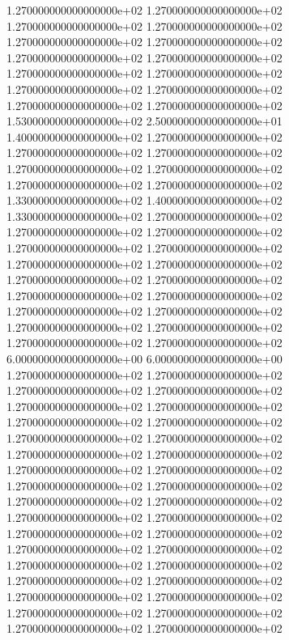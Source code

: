 1.270000000000000000e+02 1.270000000000000000e+02 1.270000000000000000e+02 1.270000000000000000e+02 1.270000000000000000e+02 1.270000000000000000e+02 1.270000000000000000e+02 1.270000000000000000e+02 1.270000000000000000e+02 1.270000000000000000e+02 1.270000000000000000e+02 1.270000000000000000e+02 1.270000000000000000e+02 1.270000000000000000e+02 1.530000000000000000e+02 2.500000000000000000e+01 1.400000000000000000e+02 1.270000000000000000e+02 1.270000000000000000e+02 1.270000000000000000e+02 1.270000000000000000e+02 1.270000000000000000e+02 1.270000000000000000e+02 1.270000000000000000e+02 1.330000000000000000e+02 1.400000000000000000e+02 1.330000000000000000e+02 1.270000000000000000e+02 1.270000000000000000e+02 1.270000000000000000e+02 1.270000000000000000e+02 1.270000000000000000e+02 1.270000000000000000e+02 1.270000000000000000e+02 1.270000000000000000e+02 1.270000000000000000e+02 1.270000000000000000e+02 1.270000000000000000e+02 1.270000000000000000e+02 1.270000000000000000e+02 1.270000000000000000e+02 1.270000000000000000e+02 1.270000000000000000e+02 1.270000000000000000e+02 6.000000000000000000e+00 6.000000000000000000e+00 1.270000000000000000e+02 1.270000000000000000e+02 1.270000000000000000e+02 1.270000000000000000e+02 1.270000000000000000e+02 1.270000000000000000e+02 1.270000000000000000e+02 1.270000000000000000e+02 1.270000000000000000e+02 1.270000000000000000e+02 1.270000000000000000e+02 1.270000000000000000e+02 1.270000000000000000e+02 1.270000000000000000e+02 1.270000000000000000e+02 1.270000000000000000e+02 1.270000000000000000e+02 1.270000000000000000e+02 1.270000000000000000e+02 1.270000000000000000e+02 1.270000000000000000e+02 1.270000000000000000e+02 1.270000000000000000e+02 1.270000000000000000e+02 1.270000000000000000e+02 1.270000000000000000e+02 1.270000000000000000e+02 1.270000000000000000e+02 1.270000000000000000e+02 1.270000000000000000e+02 1.270000000000000000e+02 1.270000000000000000e+02 1.270000000000000000e+02 1.270000000000000000e+02
